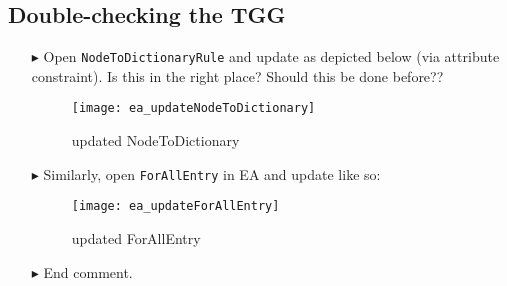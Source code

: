 \newpage
\hypertarget{m2tvis}{}
\subsection{Double-checking the TGG}
\visHeader

\begin{itemize}

\item[$\blacktriangleright$] Open \texttt{NodeToDictionaryRule} and update as depicted below (via attribute constraint). Is this in the right place? Should this
be done before??

\begin{figure}[htp]
\begin{center}
  \texttt{[image: ea\_updateNodeToDictionary]}
  \caption{updated NodeToDictionary}
  \label{ea:NodeToDictionary_updated}
\end{center}
\end{figure}

\item[$\blacktriangleright$] Similarly, open \texttt{ForAllEntry} in EA and update like so:

\begin{figure}[htp]
\begin{center}
  \texttt{[image: ea\_updateForAllEntry]}
  \caption{updated ForAllEntry}
  \label{ea:ForAllEntry_updated}
\end{center}
\end{figure}

\item[$\blacktriangleright$] End comment.


\end{itemize}
